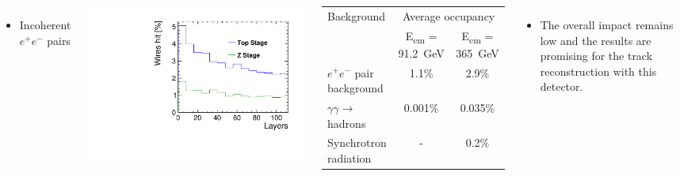 \documentclass[final,xcolor={dvipsnames,svgnames,x11names,table}]{beamer}
\begin{document}
\begin{frame}
\begin{textblock}{80}
\begin{tcolorbox}[title=Main sources of beam-induced backgrounds at the FCC-ee and the impact on the IDEA drift chamber]
\begin{columns}

    \begin{itemize}
      \item Incoherent $e^+e^-$ pairs
    \end{itemize}
    \centering
    \includegraphics[width=\textwidth]{Figures/incoherent_top_Z.pdf}

    \begin{adjustbox}{max width=\textwidth}
      \begin{tabular}{l c c}
        \toprule
         Background & \multicolumn{2}{c}{Average occupancy} \\
          & E\textsubscript{cm} = 91.2~GeV &  E\textsubscript{cm} = 365~GeV \\
         \midrule
         $e^+e^-$ pair background & 1.1\% & 2.9\% \\
         $\gamma\gamma\rightarrow$ hadrons & 0.001\% & 0.035\%  \\
         Synchrotron radiation & - & 0.2\% \\
         \bottomrule
      \end{tabular}
    \end{adjustbox}

    \begin{itemize}
      \item The overall impact remains low and the results are promising for the track reconstruction with this detector.
    \end{itemize}

  \end{columns}

  \end{tcolorbox}
\end{textblock}



\end{frame}
\end{document}
